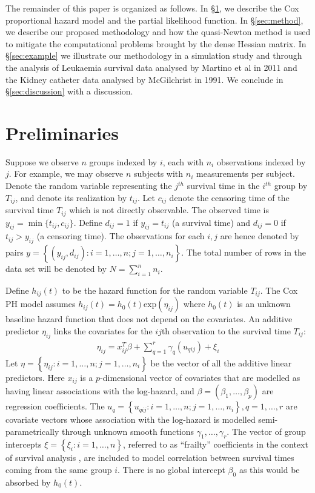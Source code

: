 \documentclass[num-refs,serif,10pt]{wiley-article}
\begin{document}
The remainder of this paper is organized as follows. In \S\ref{sec:prelim}, we describe the Cox proportional hazard model and the partial likelihood function. In \S\ref{sec:method}, we describe our proposed methodology and how the quasi-Newton method is used to mitigate the computational problems brought by the dense Hessian matrix. In \S\ref{sec:example} we illustrate our methodology in a simulation study and through the analysis of Leukaemia survival data analysed by Martino et al in 2011 \citep{inlacoxph} and the Kidney catheter data analysed by McGilchrist \citep{kidney} in 1991. We conclude in \S\ref{sec:discussion} with a discussion.


\section{Preliminaries}\label{sec:prelim}

Suppose we observe $n$ groups indexed by $i$, each with $n_{i}$ observations indexed by $j$. For example, we may observe $n$ subjects with $n_{i}$ measurements per subject. Denote the random variable representing the $j^{th}$ survival time in the $i^{th}$ group by $T_{ij}$, and denote its realization by $t_{ij}$. Let $c_{ij}$ denote the censoring time of the survival time $T_{ij}$ which is not directly observable. The observed time is $y_{ij} = \min\{t_{ij},c_{ij}\}$. Define $d_{ij} = 1$ if $y_{ij} = t_{ij}$ (a survival time) and $d_{ij} = 0$ if $t_{ij} > y_{ij}$ (a censoring time). The observations for each $i,j$ are hence denoted by pairs $y =  \left\{(y_{ij},d_{ij}): i = 1,\ldots,n; j = 1,\ldots,n_{i} \right\}$. The total number of rows in the data set will be denoted by $N = \sum_{i=1}^{n}n_{i}$.

Define $h_{ij}(t)$ to be the hazard function for the random variable $T_{ij}$. The Cox PH model assumes $h_{ij}(t) = h_0(t)\text{exp}(\eta_{ij})$ where $h_0(t)$ is an unknown baseline hazard function that does not depend on the covariates. An additive predictor $\eta_{ij}$ links the covariates for the $ij$th observation to the survival time $T_{ij}$:
\begin{equation}\begin{aligned}\label{eqn:eta}
\eta_{ij} =x_{ij}^{T}\beta+\sum_{q=1}^{r} \gamma_q(u_{qij}) +\xi_{i}
\end{aligned}\end{equation}
Let $\eta = \left\{ \eta_{ij}: i = 1,\ldots,n; j = 1,\ldots,n_{i}\right\}$ be the vector of all the additive linear predictors. Here $x_{ij}$ is a $p$-dimensional vector of covariates that are modelled as having linear associations with the log-hazard, and $\beta = (\beta_{1},\ldots,\beta_{p})$ are regression coefficients. The $u_{q} = \left\{u_{qij}: i = 1,\ldots,n; j = 1,\ldots,n_{i} \right\}, q = 1,\ldots,r$ are covariate vectors whose association with the log-hazard is modelled semi-parametrically through unknown smooth functions $\gamma_1,\ldots,\gamma_r$. The vector of group intercepts $\xi = \left\{ \xi_{i}: i=1,\ldots,n\right\}$, referred to as ``frailty'' coefficients in the context of survival analysis \cite{frailty}, are included to model correlation between survival times coming from the same group $i$. There is no global intercept $\beta_{0}$ as this would be absorbed by $h_{0}(t)$.
\end{document}
